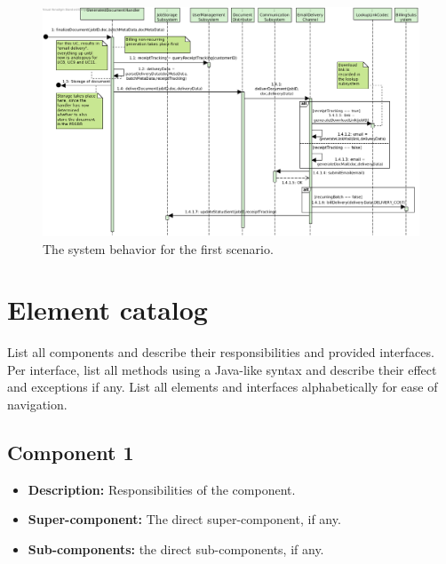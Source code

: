 \documentclass[a4paper,10pt]{article}
\begin{document}
\begin{figure}[!htp]
    \centering
    \includegraphics[width=\textwidth]{figures/UC6 - Deliver document via e-mail.png}
    \caption{The system behavior for the first scenario.
        }\label{fig:seq_scenario1}
\end{figure}

\appendix
\section{Element catalog}\label{app:catalog}
List all components and describe their responsibilities and provided
interfaces.
Per interface, list all methods using a Java-like syntax and describe their
effect and exceptions if any.
List all elements and interfaces alphabetically for ease of navigation.

\subsection{Component 1}
\begin{itemize}
    \item \textbf{Description:} Responsibilities of the component.
    \item \textbf{Super-component:} The direct super-component, if any.
    \item \textbf{Sub-components:} the direct sub-components, if any.
\end{itemize}
\end{document}
